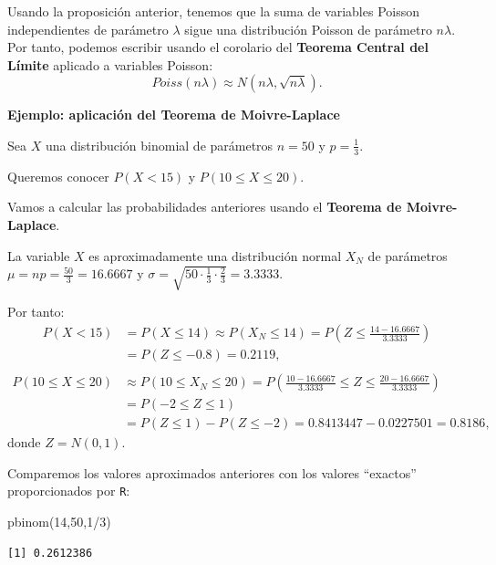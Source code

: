 \documentclass[
  letterpaper,
  DIV=11,
  numbers=noendperiod]{scrreprt}
\newenvironment{Shaded}{\begin{snugshade}}{\end{snugshade}}
\newcommand{\DecValTok}[1]{\textcolor[rgb]{0.68,0.00,0.00}{#1}}
\newcommand{\FunctionTok}[1]{\textcolor[rgb]{0.28,0.35,0.67}{#1}}
\newcommand{\NormalTok}[1]{\textcolor[rgb]{0.00,0.23,0.31}{#1}}
\newcommand{\SpecialCharTok}[1]{\textcolor[rgb]{0.37,0.37,0.37}{#1}}
\begin{document}
Usando la proposición anterior, tenemos que la suma de variables Poisson
independientes de parámetro \(\lambda\) sigue una distribución Poisson
de parámetro \(n\lambda\). Por tanto, podemos escribir usando el
corolario del \textbf{Teorema Central del Límite} aplicado a variables
Poisson: \[
Poiss(n\lambda)\approx N(n\lambda,\sqrt{n\lambda}).
\]

\textbf{Ejemplo: aplicación del Teorema de Moivre-Laplace}

Sea \(X\) una distribución binomial de parámetros \(n=50\) y
\(p=\frac{1}{3}\).

Queremos conocer \(P(X < 15)\) y \(P(10\leq X\leq 20)\).

Vamos a calcular las probabilidades anteriores usando el \textbf{Teorema
de Moivre-Laplace}.

La variable \(X\) es aproximadamente una distribución normal \(X_N\) de
parámetros \(\mu = np=\frac{50}{3}=16.6667\) y
\(\sigma=\sqrt{50\cdot\frac{1}{3}\cdot \frac{2}{3}}=3.3333\).

Por tanto: \[
\begin{array}{rl}
P(X< 15) 
& = P(X\leq 14) \approx P(X_N \leq 14)=P\left(Z\leq \frac{14-16.6667}{3.3333}\right)\\& 
=P(Z\leq -0.8) = 0.2119,\\
\end{array}
\] \[
\begin{array}{rl}
P(10\leq X\leq 20) 
& \approx P(10\leq X_N \leq 20) = P\left(\frac{10-16.6667}{3.3333}\leq  Z\leq \frac{20-16.6667}{3.3333}\right) \\ 
& = P(-2\leq Z\leq 1) \\ 
& = P(Z\leq 1)-P(Z\leq -2)=0.8413447-0.0227501 = 0.8186,
\end{array}
\] donde \(Z=N(0,1)\).

Comparemos los valores aproximados anteriores con los valores
``exactos'' proporcionados por \texttt{R}:

\begin{Shaded}
\begin{Highlighting}[]
\FunctionTok{pbinom}\NormalTok{(}\DecValTok{14}\NormalTok{,}\DecValTok{50}\NormalTok{,}\DecValTok{1}\SpecialCharTok{/}\DecValTok{3}\NormalTok{)}
\end{Highlighting}
\end{Shaded}

\begin{verbatim}
[1] 0.2612386
\end{verbatim}
\end{document}
